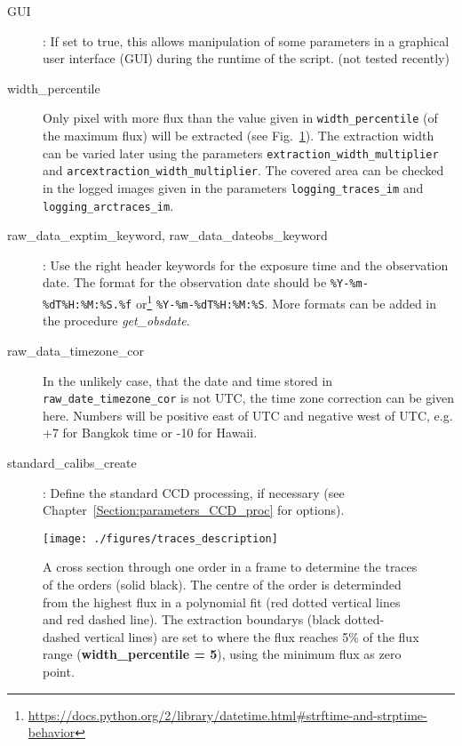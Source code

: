 \documentclass[10pt,a4paper]{article}
\begin{document}
\begin{description}
  \item[GUI] : If set to true, this allows manipulation of some parameters in a graphical user interface (GUI) during the runtime of the script. (not tested recently)
  \item[width\_percentile] Only pixel with more flux than the value given in \verb|width_percentile| (of the maximum flux) will be extracted (see Fig.~\ref{Fig:traces_description}). The extraction width can be varied later using the parameters \verb|extraction_width_multiplier| and \verb|arcextraction_width_multiplier|. The covered area can be checked in the logged images given in the parameters \verb|logging_traces_im| and \verb|logging_arctraces_im|. %
  \item[raw\_data\_exptim\_keyword, raw\_data\_dateobs\_keyword] : Use the right header keywords for the exposure time and the observation date. The format for the observation date should be \verb|%Y-%m-%dT%H:%M:%S.%f| or\footnote{\url{https://docs.python.org/2/library/datetime.html\#strftime-and-strptime-behavior}} \verb|%Y-%m-%dT%H:%M:%S|. More formats can be added in the procedure \textit{get\_obsdate}.
  \item[raw\_data\_timezone\_cor] In the unlikely case, that the date and time stored in \verb|raw_date_timezone_cor| is not UTC, the time zone correction can be given here. Numbers will be positive east of UTC and negative west of UTC, e.g. +7 for Bangkok time or -10 for Hawaii.
  \item[standard\_calibs\_create] : Define the standard CCD processing, if necessary (see Chapter~\ref{Section:parameters_CCD_proc} for options).
\end{description}

\begin{figure} 
  \begin{center}
    \texttt{[image: ./figures/traces\_description]}
  \end{center} 
  \caption{A cross section through one order in a frame to determine the traces of the orders (solid black). The centre of the order is determinded from the highest flux in a polynomial fit (red dotted vertical lines and red dashed line). The extraction boundarys (black dotted-dashed vertical lines) are set to where the flux reaches 5\% of the flux range (\textbf{width\_percentile = 5}), using the minimum flux as zero point.
    \label{Fig:traces_description}}
\end{figure}
\end{document}
